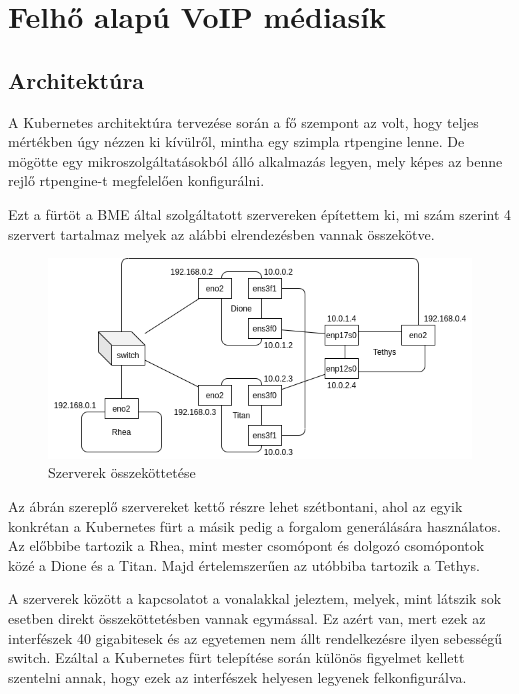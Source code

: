 \chapter{Felhő alapú VoIP médiasík}

\section{Architektúra}

A Kubernetes architektúra tervezése során a fő szempont az volt, hogy teljes
mértékben úgy nézzen ki kívülről, mintha egy szimpla rtpengine lenne. De 
mögötte egy mikroszolgáltatásokból álló alkalmazás legyen, mely képes
az benne rejlő rtpengine-t megfelelően konfigurálni.

Ezt a fürtöt a BME által szolgáltatott szervereken építettem ki, mi szám szerint
4 szervert tartalmaz melyek az alábbi elrendezésben vannak összekötve.

\begin{figure}[!ht]
	\centering
	\includegraphics[width=1\textwidth, keepaspectratio]{figures/servers.png}
	\caption{Szerverek összeköttetése}
	\label{fig:servers}
\end{figure}

Az ábrán szereplő szervereket kettő részre lehet szétbontani, ahol az egyik
konkrétan a Kubernetes fürt a másik pedig a forgalom generálására használatos.
Az előbbibe tartozik a Rhea, mint mester csomópont és dolgozó csomópontok közé 
a Dione és a Titan. Majd értelemszerűen az utóbbiba tartozik a Tethys. 

A szerverek között a kapcsolatot a vonalakkal jeleztem, melyek, mint látszik
sok esetben direkt összeköttetésben vannak egymással. Ez azért van, mert ezek
az interfészek 40 gigabitesek és az egyetemen nem állt rendelkezésre ilyen 
sebességű switch. Ezáltal a Kubernetes fürt telepítése során különös figyelmet
kellett szentelni annak, hogy ezek az interfészek helyesen legyenek felkonfigurálva.

